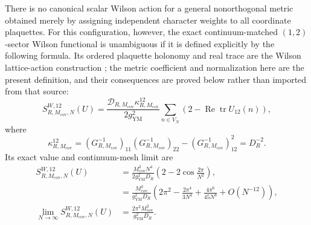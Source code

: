 \begin{theorem}
There is no canonical scalar Wilson action for a general nonorthogonal
metric obtained merely by assigning independent character weights to all
coordinate plaquettes.  For this configuration, however, the exact
continuum-matched \((1,2)\)-sector Wilson functional is unambiguous if it is
defined explicitly by the following formula.  Its ordered plaquette
holonomy and real trace are the Wilson lattice-action construction
\cite{Wilson_1974}; the metric coefficient and normalization here are the
present definition, and their consequences are proved below rather than
imported from that source:
\begin{equation}
 S^{W,12}_{R,M_{\mathrm{cov}},N}(U)
 =\frac{\mathcal D_{R,M_{\mathrm{cov}}}\kappa^{12}_{R,M_{\mathrm{cov}}}}
        {2g_{\mathrm{YM}}^2}
   \sum_{n\in V_N}
   \left(2-\operatorname{Re}\operatorname{tr}U_{12}(n)\right),
 \label{cusp-link-wilson-sector-definition}
\end{equation}
where
\begin{equation}
 \kappa^{12}_{R,M_{\mathrm{cov}}}
 =(G_{R,M_{\mathrm{cov}}}^{-1})_{11}
  (G_{R,M_{\mathrm{cov}}}^{-1})_{22}
 -(G_{R,M_{\mathrm{cov}}}^{-1})_{12}^2
 =D_R^{-2}.
 \label{cusp-link-two-form-minor}
\end{equation}
Its exact value and continuum-mesh limit are
\begin{align}
 S^{W,12}_{R,M_{\mathrm{cov}},N}(U)
 &=\frac{M_{\mathrm{cov}}^2N^4}{2g_{\mathrm{YM}}^2D_R}
   \left(2-2\cos\frac{2\pi}{N^2}\right),
 \label{cusp-link-wilson-sector-value}\\
 &=\frac{M_{\mathrm{cov}}^2}{g_{\mathrm{YM}}^2D_R}
   \left(
    2\pi^2-\frac{2\pi^4}{3N^4}
    +\frac{4\pi^6}{45N^8}+O(N^{-12})
   \right),
 \label{cusp-link-wilson-sector-expansion}\\
 \lim_{N\to\infty}S^{W,12}_{R,M_{\mathrm{cov}},N}(U)
 &=\frac{2\pi^2M_{\mathrm{cov}}^2}{g_{\mathrm{YM}}^2D_R}.
 \label{cusp-link-wilson-sector-limit}
\end{align}
\end{theorem}

